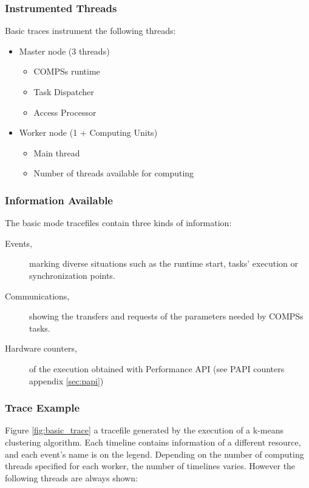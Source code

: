 \subsubsection{Instrumented Threads}


Basic traces instrument the following threads:

\begin{itemize}
 \item Master node (3 threads)
 \begin {itemize}
 \item COMPSs runtime
 \item Task Dispatcher
 \item Access Processor
 \end{itemize}
 \item Worker node (1 + Computing Units)
 \begin{itemize}
  \item Main thread
  \item Number of threads available for computing
 \end{itemize}
\end{itemize}

\subsubsection{Information Available}

The basic mode tracefiles contain three kinds of information:

\begin{description}
 \item [Events,] marking diverse situations such as the runtime start, tasks' execution or synchronization points.
 \item [Communications,] showing the transfers and requests of the parameters needed by COMPSs tasks.
 \item [Hardware counters,] of the execution obtained with Performance API (see PAPI counters appendix \ref{sec:papi})
\end{description}


\subsubsection{Trace Example}

Figure \ref{fig:basic_trace} a tracefile generated by the execution of a k-means clustering algorithm. Each timeline contains information of a 
different resource, and each event's name is on the legend. Depending on the number of computing threads specified for each worker, the number of timelines varies. 
However the following threads are always shown:




